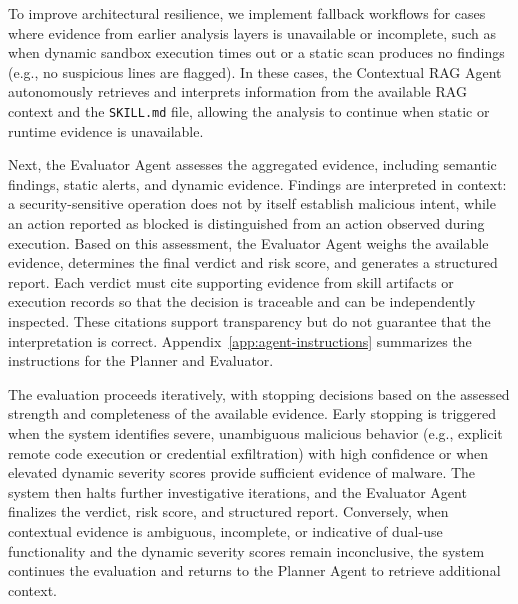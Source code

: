 To improve architectural resilience, we implement fallback workflows for cases where
evidence from earlier analysis layers is unavailable or incomplete, such as when dynamic
sandbox execution times out or a static scan produces no findings (e.g., no suspicious
lines are flagged). In these cases, the Contextual RAG Agent autonomously retrieves and
interprets information from the available RAG context and the \texttt{SKILL.md} file,
allowing the analysis to continue when static or runtime evidence is unavailable.

Next, the Evaluator Agent assesses the aggregated evidence,
including semantic findings, static alerts, and dynamic
evidence. Findings are interpreted in context:
a security-sensitive operation does not by itself
establish malicious intent, while an action reported
as blocked is distinguished from an action observed
during execution. Based on this assessment, the
Evaluator Agent weighs the available evidence,
determines the final verdict and risk score, and
generates a structured report. Each verdict must
cite supporting evidence from skill artifacts or
execution records so that the decision is traceable
and can be independently inspected. These citations
support transparency but do not guarantee that
the interpretation is correct. Appendix~\ref{app:agent-instructions} summarizes the
instructions for the Planner and Evaluator.

The evaluation proceeds iteratively, with stopping decisions
based on the assessed strength and completeness of the
available evidence.
Early stopping is triggered when the system identifies severe, unambiguous
malicious behavior (e.g., explicit remote code execution or credential exfiltration)
with high confidence or when elevated dynamic severity scores provide sufficient
evidence of malware. 
The system then halts further investigative iterations,
and the Evaluator Agent finalizes the verdict,
risk score, and structured report.
Conversely, when contextual evidence is ambiguous, incomplete, or indicative of dual-use
functionality and the dynamic severity scores remain inconclusive, the system continues
the evaluation and returns to the Planner Agent to retrieve additional context.

